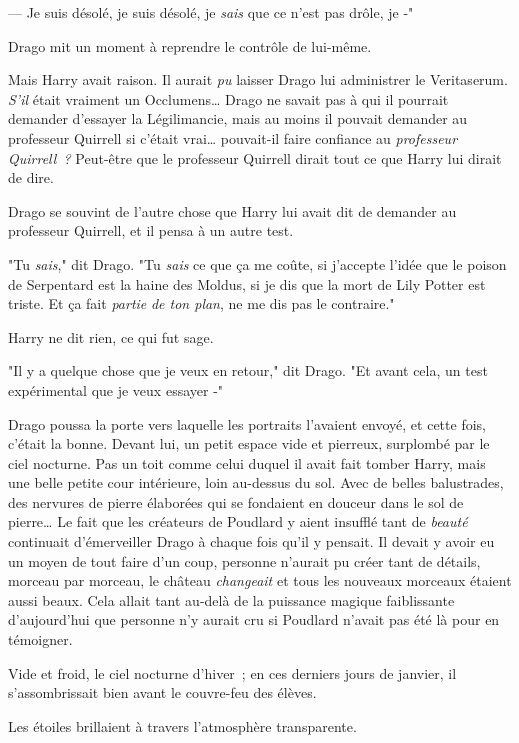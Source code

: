 --- Je suis désolé, je suis désolé, je \emph{sais} que ce n'est pas drôle, je -"

Drago mit un moment à reprendre le contrôle de lui-même.

Mais Harry avait raison. Il aurait \emph{pu} laisser Drago lui administrer le Veritaserum. \emph{S'il} était vraiment un Occlumens… Drago ne savait pas à qui il pourrait demander d'essayer la Légilimancie, mais au moins il pouvait demander au professeur Quirrell si c'était vrai… pouvait-il faire confiance au \emph{professeur Quirrell~?} Peut-être que le professeur Quirrell dirait tout ce que Harry lui dirait de dire.

Drago se souvint de l'autre chose que Harry lui avait dit de demander au professeur Quirrell, et il pensa à un autre test.

"Tu \emph{sais}," dit Drago. "Tu \emph{sais} ce que ça me coûte, si j'accepte l'idée que le poison de Serpentard est la haine des Moldus, si je dis que la mort de Lily Potter est triste. Et ça fait \emph{partie} \emph{de ton plan}, ne me dis pas le contraire."

Harry ne dit rien, ce qui fut sage.

"Il y a quelque chose que je veux en retour," dit Drago. "Et avant cela, un test expérimental que je veux essayer -"

\later

Drago poussa la porte vers laquelle les portraits l'avaient envoyé, et cette fois, c'était la bonne. Devant lui, un petit espace vide et pierreux, surplombé par le ciel nocturne. Pas un toit comme celui duquel il avait fait tomber Harry, mais une belle petite cour intérieure, loin au-dessus du sol. Avec de belles balustrades, des nervures de pierre élaborées qui se fondaient en douceur dans le sol de pierre… Le fait que les créateurs de Poudlard y aient insufflé tant de \emph{beauté} continuait d'émerveiller Drago à chaque fois qu'il y pensait. Il devait y avoir eu un moyen de tout faire d'un coup, personne n'aurait pu créer tant de détails, morceau par morceau, le château \emph{changeait} et tous les nouveaux morceaux étaient aussi beaux. Cela allait tant au-delà de la puissance magique faiblissante d'aujourd'hui que personne n'y aurait cru si Poudlard n'avait pas été là pour en témoigner.

Vide et froid, le ciel nocturne d'hiver~; en ces derniers jours de janvier, il s'assombrissait bien avant le couvre-feu des élèves.

Les étoiles brillaient à travers l'atmosphère transparente.

